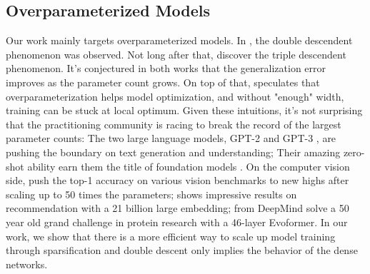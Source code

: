 \subsection{Overparameterized Models} 
Our work mainly targets overparameterized models. In \citet{nakkiran2019deep},  the double descendent phenomenon was observed. Not long after that, \cite{d2020triple} discover the triple descendent phenomenon. It's conjectured in both works that the generalization error improves as the parameter count grows. On top of that, \citet{arora2018optimization} speculates that overparameterization helps model optimization,
and without "enough" width, training can be stuck at local optimum. Given these intuitions, it's not surprising that the practitioning community is racing to break the record of the largest parameter counts: The two large language models, GPT-2 and GPT-3 \citep{radford2019language, brown2020language}, are pushing the boundary on text generation and understanding; Their amazing zero-shot ability earn them the title of foundation models \citep{bommasani2021opportunities}. On the computer vision side, \citet{dosovitskiy2020image, tolstikhin2021mlp, zhai2021scaling} push the top-1 accuracy on various vision benchmarks to new highs after scaling up to 50 times the parameters; \citet{naumov2019deep} shows impressive results on recommendation with a 21 billion large embedding; \citet{jumper2021highly} from DeepMind solve a 50 year old grand challenge in protein research with a 46-layer Evoformer. In our work, we show that there is a more efficient way to scale up model training through sparsification and double descent only implies the behavior of the dense networks.
